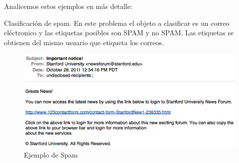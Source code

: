 Analicemos estos ejemplos en más detalle:

\begin{example}
Clasificación de spam. En este problema el objeto a clasificar es un correo eléctronico y las etiquetas posibles son SPAM y no SPAM. Las etiquetas se obtienen del mismo usuario que etiqueta los correos.

\begin{figure}[h]
    \centering
    \includegraphics[scale = 0.35]{pics/spam.png}
    \caption{Ejemplo de Spam}
    \label{fig:chomsky}
\end{figure}
 
 
\end{example}




